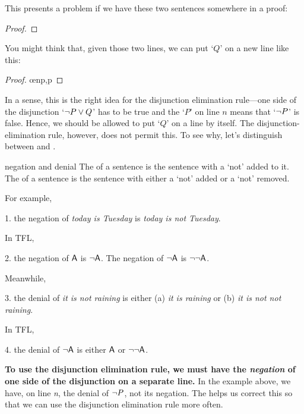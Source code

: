 This presents a problem if we have these two sentences somewhere in a proof:
\begin{proof}
\end{proof}
You might think that, given those two lines, we can put `$Q$' on a new line like this:
\begin{proof}
	 \oe{np,p}
\end{proof}
In a sense, this is the right idea for the disjunction elimination rule---one side of the disjunction `${\neg} P \vee Q$' has to be true and the `$P$' on line $n$ means that `${\neg} P$' is false. Hence, we should be allowed to put `$Q$' on a line by itself. The disjunction-elimination rule, however, does not permit this. To see why, let's distinguish between  and .

\begin{factboxy}{negation and denial}
The  of a sentence is the sentence with a `not' added to it.\\ 
The  of a sentence is the sentence with either a `not' added or a `not' removed.
\end{factboxy}

\noindent For example, 
\begin{earg}
\item[1.] the negation of \textit{today is Tuesday} is \textit{today is not Tuesday}. 
\end{earg}
In TFL, 
\begin{earg}
\item[2.] the negation of $\mathsf{A}$ is ${\neg}\mathsf{A}$. The negation of ${\neg}\mathsf{A}$ is ${\neg}{\neg}\mathsf{A}$.
\end{earg}
Meanwhile,
\begin{earg}
\item[3.] the denial of \textit{it is not raining} is either (a) \textit{it is raining} or (b) \textit{it is not not raining}. 
\end{earg}
In TFL,
\begin{earg}
\item[4.] the denial of ${\neg}\mathsf{A}$ is either $\mathsf{A}$ or ${\neg}{\neg}\mathsf{A}$.
\end{earg}
\textbf{To use the disjunction elimination rule, we must have the \textit{negation} of one side of the disjunction on a separate line.} In the example above, we have, on line \textit{n}, the denial of ${\neg} P$, not its negation. The  helps us correct this so that we can use the disjunction elimination rule more often. 

